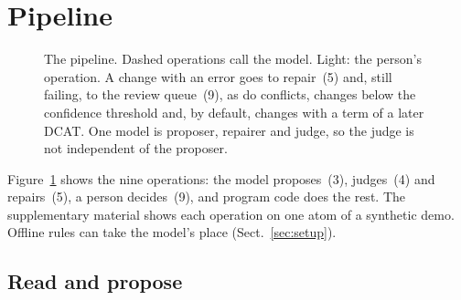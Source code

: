 \section{Pipeline}\label{sec:pipeline}

\begin{figure}[t]
  \centering
  
  \caption{The pipeline. Dashed operations call the model. Light: the person's operation. A change with an error
    goes to repair~(5) and, still failing, to the review queue~(9), as do conflicts, changes below the confidence %
    threshold and, by default, changes with a term of a later \acs{DCAT}. One model is proposer, repairer and
    judge, so the judge is not independent of the proposer.}
  \label{fig:pipeline}
\end{figure}

Figure~\ref{fig:pipeline} shows the nine operations: the model proposes~(3), judges~(4) and repairs~(5), a person %
decides~(9), and program code does the rest. The supplementary material shows each operation on one atom of a
synthetic demo. 
Offline rules can take the model's place (Sect.~\ref{sec:setup}). %

\subsection{Read and propose}\label{sec:read}

